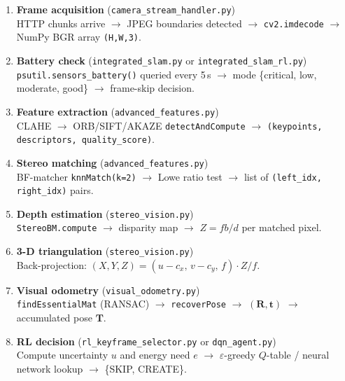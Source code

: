 \documentclass[12pt,a4paper,twoside]{report}
\theoremstyle{definition}
\newcommand{\vect}[1]{\bm{#1}}
\newcommand{\mat}[1]{\mathbf{#1}}
\newcommand{\code}[1]{\texttt{#1}}
\newcommand{\file}[1]{\texttt{\textcolor{codeblue}{#1}}}
\begin{document}
\begin{enumerate}[leftmargin=1.5em, label=\textbf{Step~\arabic*.}]

  \item \textbf{Frame acquisition} (\file{camera\_stream\_handler.py})\\
        HTTP chunks arrive $\to$ JPEG boundaries detected $\to$ \code{cv2.imdecode}
        $\to$ NumPy BGR array \code{(H,W,3)}.

  \item \textbf{Battery check} (\file{integrated\_slam.py} or \file{integrated\_slam\_rl.py})\\
        \code{psutil.sensors\_battery()} queried every 5\,s $\to$ mode
        \{critical, low, moderate, good\} $\to$ frame-skip decision.

  \item \textbf{Feature extraction} (\file{advanced\_features.py})\\
        CLAHE $\to$ ORB/SIFT/AKAZE \code{detectAndCompute}
        $\to$ \code{(keypoints, descriptors, quality\_score)}.

  \item \textbf{Stereo matching} (\file{advanced\_features.py})\\
        BF-matcher \code{knnMatch(k=2)} $\to$ Lowe ratio test $\to$
        list of \code{(left\_idx, right\_idx)} pairs.

  \item \textbf{Depth estimation} (\file{stereo\_vision.py})\\
        \code{StereoBM.compute} $\to$ disparity map $\to$
        $Z = fb/d$ per matched pixel.

  \item \textbf{3-D triangulation} (\file{stereo\_vision.py})\\
        Back-projection: $(X,Y,Z) = (u-c_x,\, v-c_y,\, f) \cdot Z/f$.

  \item \textbf{Visual odometry} (\file{visual\_odometry.py})\\
        \code{findEssentialMat} (RANSAC) $\to$ \code{recoverPose}
        $\to$ $(\mat{R}, \vect{t})$ $\to$ accumulated pose $\mat{T}$.

  \item \textbf{RL decision} (\file{rl\_keyframe\_selector.py} or \file{dqn\_agent.py})\\
        Compute uncertainty $u$ and energy need $e$ $\to$
        $\varepsilon$-greedy $Q$-table / neural network lookup
        $\to$ \{SKIP, CREATE\}.


\end{enumerate}
\end{document}
